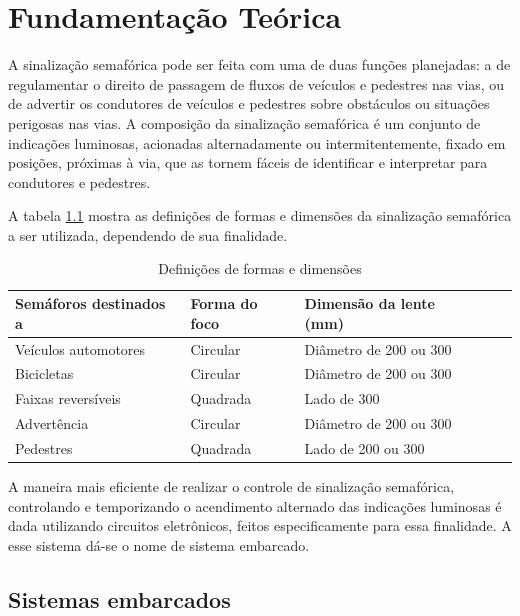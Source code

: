 \chapter{Fundamentação Teórica}

A sinalização semafórica pode ser feita com uma de duas funções planejadas: a de regulamentar o direito de passagem de fluxos de veículos e pedestres nas vias, ou de advertir os condutores de veículos e pedestres sobre obstáculos ou situações perigosas nas vias. A composição da sinalização semafórica é um conjunto de indicações luminosas, acionadas alternadamente ou intermitentemente, fixado em posições, próximas à via, que as tornem fáceis de identificar e interpretar para condutores e pedestres\cite{sinalizacao}. 

A tabela \ref{tab: focos} mostra as definições de formas e dimensões da sinalização semafórica a ser utilizada, dependendo de sua finalidade.

\begin{table}[H]
\centering
\caption{Definições de formas e dimensões}
\label{tab: focos}
\begin{tabular}{@{}lllll@{}}
\toprule
Semáforos destinados a & Forma do foco & Dimensão da lente (mm) \\ \midrule
Veículos automotores & Circular & Diâmetro de 200 ou 300 \\
Bicicletas & Circular & Diâmetro de 200 ou 300 \\
Faixas reversíveis          &	Quadrada & Lado de 300		  \\
Advertência & Circular & Diâmetro de 200 ou 300 \\
Pedestres & Quadrada & Lado de 200 ou 300 \\
\bottomrule
\end{tabular}
\end{table}

A maneira mais eficiente de realizar o controle de sinalização semafórica, controlando e temporizando o acendimento alternado das indicações luminosas é dada utilizando circuitos eletrônicos, feitos especificamente para essa finalidade. A esse sistema dá-se o nome de sistema embarcado. 

\section{Sistemas embarcados}


